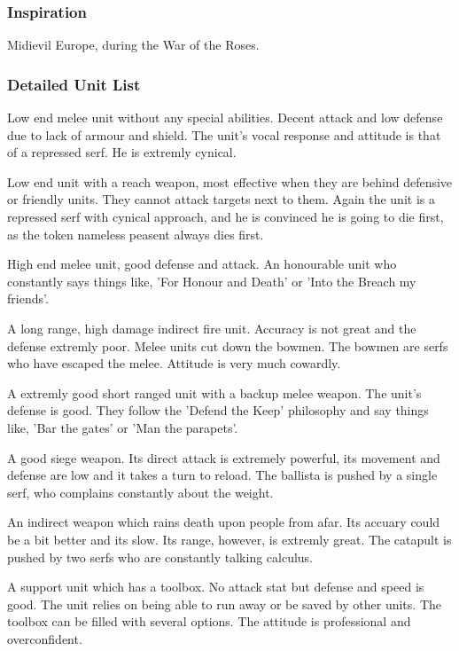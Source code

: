 \documentclass[a4paper]{article}
\begin{document}
\subsubsection{Inspiration}

Midievil Europe, during the War of the Roses.

\subsubsection{Detailed Unit List}

Low end melee unit without any special abilities. Decent attack and low defense due to lack of armour and shield.
The unit's vocal response and attitude is that of a repressed serf. He is extremly cynical.

Low end unit with a reach weapon, most effective when they are behind defensive or friendly units. They cannot attack targets next to them. Again the unit is a repressed serf with cynical approach, and he is convinced he is going to die first, as the token nameless peasent always dies first.

High end melee unit, good defense and attack. An honourable unit who constantly says things like, 'For Honour and Death' or 'Into the Breach my friends'.

A long range, high damage indirect fire unit. Accuracy is not great and the defense extremly poor. Melee units cut down the bowmen. The bowmen are serfs who have escaped the melee. Attitude is very much cowardly.

A extremly good short ranged unit with a backup melee weapon. The unit's defense is good. They follow the 'Defend the Keep' philosophy and say things like, 'Bar the gates' or 'Man the parapets'.

A good siege weapon. Its direct attack is extremely powerful, its movement and defense are low and it takes a turn to reload. The ballista is pushed by a single serf, who complains constantly about the weight.

An indirect weapon which rains death upon people from afar. Its accuary could be a bit better and its slow. Its range, however, is extremly great. The catapult is pushed by two serfs who are constantly talking calculus.

A support unit which has a toolbox. No attack stat but defense and speed is good. The unit relies on being able to run away or be saved by other units. The toolbox can be filled with several options. The attitude is professional and overconfident.
\end{document}
